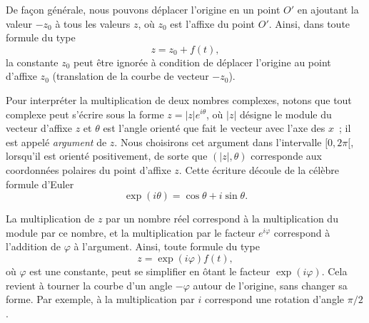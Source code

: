 \begin{figure}[ht]
\begin{center}
\shorthandoff{!}\shorthandoff{:}
\shorthandon{!}\shorthandoff{:}
\caption{}\label{fig:02}
\end{center}
\end{figure}

De façon générale, nous pouvons déplacer l'origine en un point $O'$ en ajoutant la valeur $-z_0$ à tous les valeurs $z$, où $z_0$ est l'affixe du point $O'$. Ainsi, dans toute formule du type
$$z=z_0+f(t),$$ 
la constante $z_0$ peut être ignorée à condition de déplacer l'origine au point d'affixe $z_0$ (translation de la courbe de vecteur $-z_0$).

Pour interpréter la multiplication de deux nombres complexes, notons que tout complexe peut s'écrire sous la forme $z=|z| e^{i \theta}$, où $|z|$ désigne le module du vecteur d'affixe $z$ et $\theta$ est l'angle orienté que fait le vecteur avec l'axe des $x$~; il est appelé \emph{argument} de $z$. Nous choisirons cet argument dans l'intervalle $[0,2 \pi[$, lorsqu'il est orienté positivement, de sorte que $(|z|, \theta)$ corresponde aux coordonnées polaires du point d'affixe $z$. Cette écriture découle de la célèbre formule d'Euler 
$$\exp(i \theta)=\cos \theta + i \sin \theta.$$  

La multiplication de $z$ par un nombre réel correspond à la multiplication du module par ce nombre, et la multiplication par le facteur $e^{i \varphi}$ correspond à l'addition de $\varphi$ à l'argument. Ainsi, toute formule du type
$$z=\exp(i \varphi)f(t),$$
où $\varphi$ est une constante, peut se simplifier en ôtant le facteur $\exp(i \varphi)$. Cela revient à tourner la courbe d'un angle $-\varphi$ autour de l'origine, sans changer sa forme. Par exemple, à la multiplication par $i$ correspond une rotation d'angle $\pi/2$. 

